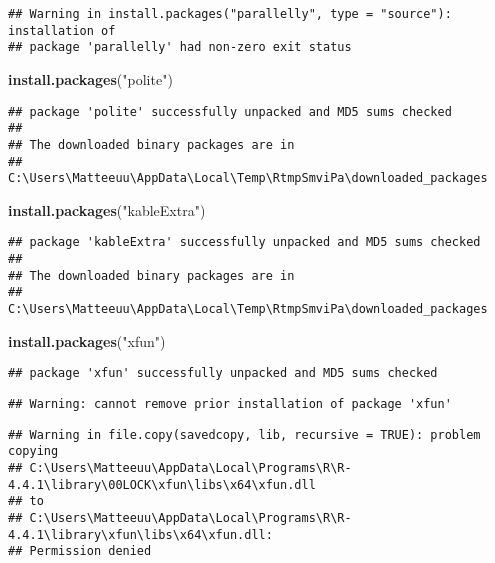 \documentclass[
]{article}
\newenvironment{Shaded}{\begin{snugshade}}{\end{snugshade}}
\newcommand{\FunctionTok}[1]{\textcolor[rgb]{0.13,0.29,0.53}{\textbf{#1}}}
\newcommand{\NormalTok}[1]{#1}
\newcommand{\StringTok}[1]{\textcolor[rgb]{0.31,0.60,0.02}{#1}}
\begin{document}
\begin{verbatim}
## Warning in install.packages("parallelly", type = "source"): installation of
## package 'parallelly' had non-zero exit status
\end{verbatim}

\begin{Shaded}
\begin{Highlighting}[]
\FunctionTok{install.packages}\NormalTok{(}\StringTok{"polite"}\NormalTok{)}
\end{Highlighting}
\end{Shaded}

\begin{verbatim}
## package 'polite' successfully unpacked and MD5 sums checked
## 
## The downloaded binary packages are in
##  C:\Users\Matteeuu\AppData\Local\Temp\RtmpSmviPa\downloaded_packages
\end{verbatim}

\begin{Shaded}
\begin{Highlighting}[]
\FunctionTok{install.packages}\NormalTok{(}\StringTok{"kableExtra"}\NormalTok{)}
\end{Highlighting}
\end{Shaded}

\begin{verbatim}
## package 'kableExtra' successfully unpacked and MD5 sums checked
## 
## The downloaded binary packages are in
##  C:\Users\Matteeuu\AppData\Local\Temp\RtmpSmviPa\downloaded_packages
\end{verbatim}

\begin{Shaded}
\begin{Highlighting}[]
\FunctionTok{install.packages}\NormalTok{(}\StringTok{"xfun"}\NormalTok{)}
\end{Highlighting}
\end{Shaded}

\begin{verbatim}
## package 'xfun' successfully unpacked and MD5 sums checked
\end{verbatim}

\begin{verbatim}
## Warning: cannot remove prior installation of package 'xfun'
\end{verbatim}

\begin{verbatim}
## Warning in file.copy(savedcopy, lib, recursive = TRUE): problem copying
## C:\Users\Matteeuu\AppData\Local\Programs\R\R-4.4.1\library\00LOCK\xfun\libs\x64\xfun.dll
## to
## C:\Users\Matteeuu\AppData\Local\Programs\R\R-4.4.1\library\xfun\libs\x64\xfun.dll:
## Permission denied
\end{verbatim}
\end{document}
